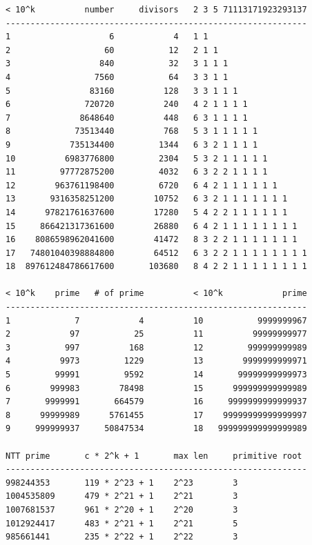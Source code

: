 \begin{verbatim}
< 10^k          number     divisors   2 3 5 71113171923293137
-------------------------------------------------------------
1                    6            4   1 1
2                   60           12   2 1 1
3                  840           32   3 1 1 1
4                 7560           64   3 3 1 1
5                83160          128   3 3 1 1 1
6               720720          240   4 2 1 1 1 1
7              8648640          448   6 3 1 1 1 1
8             73513440          768   5 3 1 1 1 1 1
9            735134400         1344   6 3 2 1 1 1 1
10          6983776800         2304   5 3 2 1 1 1 1 1
11         97772875200         4032   6 3 2 2 1 1 1 1
12        963761198400         6720   6 4 2 1 1 1 1 1 1
13       9316358251200        10752   6 3 2 1 1 1 1 1 1 1
14      97821761637600        17280   5 4 2 2 1 1 1 1 1 1
15     866421317361600        26880   6 4 2 1 1 1 1 1 1 1 1
16    8086598962041600        41472   8 3 2 2 1 1 1 1 1 1 1
17   74801040398884800        64512   6 3 2 2 1 1 1 1 1 1 1 1
18  897612484786617600       103680   8 4 2 2 1 1 1 1 1 1 1 1

< 10^k    prime   # of prime          < 10^k            prime
-------------------------------------------------------------
1             7            4          10           9999999967
2            97           25          11          99999999977
3           997          168          12         999999999989
4          9973         1229          13        9999999999971
5         99991         9592          14       99999999999973
6        999983        78498          15      999999999999989
7       9999991       664579          16     9999999999999937
8      99999989      5761455          17    99999999999999997
9     999999937     50847534          18   999999999999999989

NTT prime       c * 2^k + 1       max len     primitive root
-------------------------------------------------------------
998244353       119 * 2^23 + 1    2^23        3
1004535809      479 * 2^21 + 1    2^21        3
1007681537      961 * 2^20 + 1    2^20        3
1012924417      483 * 2^21 + 1    2^21        5
985661441       235 * 2^22 + 1    2^22        3
\end{verbatim}